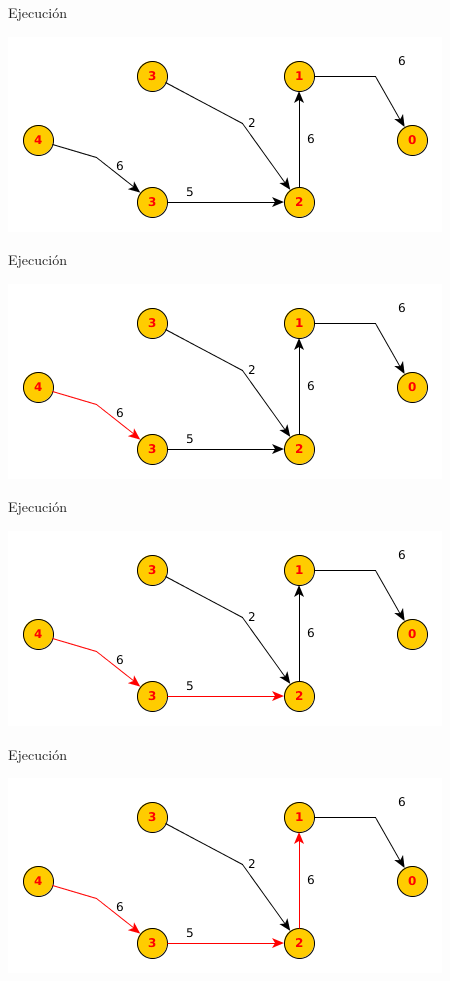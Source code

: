 \documentclass{beamer}
\begin{document}
\begin{frame}{Ejecución}

    
    \includegraphics[scale=0.6]{dinitz/dinitz20.png}
    
\end{frame}

\begin{frame}{Ejecución}

    
    \includegraphics[scale=0.6]{dinitz/dinitz21.png}
    
\end{frame}

\begin{frame}{Ejecución}

    
    \includegraphics[scale=0.6]{dinitz/dinitz22.png}
    
\end{frame}

\begin{frame}{Ejecución}

    \includegraphics[scale=0.6]{dinitz/dinitz23.png}
    
\end{frame}
\end{document}
